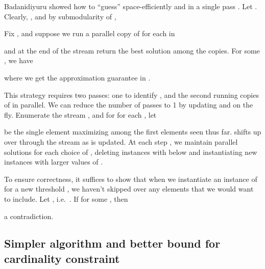 \documentclass[oneside,letterpaper]{scrartcl} \usepackage{macros}
\begin{document}
Badanidiyuru \etal showed how to ``guess''  space-efficiently
and in a single pass \cite{bmkk-sso-14}. Let . Clearly, , and by submodularity
of ,

Fix , and suppose we run a parallel copy of
 for each  in

and at the end of the stream return the best solution among the  copies. For some , we have

where we get the approximation guarantee in
.

This strategy requires two passes: one to identify , and the second
running  copies of
in parallel.  We can reduce the number of passes to 1 by updating 
and  on the fly. Enumerate the stream ,
and for for each , let

be the single element maximizing  among the first  elements seen
thus far.  shifts up over through the stream as
 is updated. At each step , we maintain parallel solutions for
each choice of , deleting instances with
 below  and instantiating new instances with
larger values of .

To ensure correctness, it suffices to show that when we instantiate an
instance of
for a new threshold , we haven't skipped over any elements
that we would want to include. Let , i.e.\ . If
 for some , then

a contradiction.

\FloatBarrier
\subsection{Simpler algorithm and better bound for cardinality
  constraint}
\end{document}

